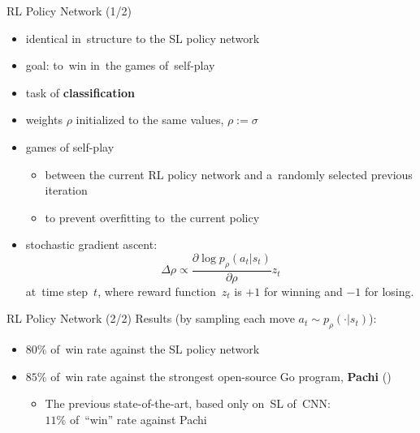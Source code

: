 \documentclass{beamer}
\begin{document}
{    \begin{frame}{RL Policy Network (1/2)}
      \begin{itemize}[<+- | alert@+>]
        \item identical in~structure to the SL policy network
        \item goal: to~win in~the games of~self-play
        \item task of \textbf{classification}
        \item weights $\rho$ initialized to the same values, $\rho := \sigma$
        \item games of self-play
          \begin{itemize}[<+- | alert@+>]
            \item between the current RL policy network and a~randomly selected previous iteration
            \item to prevent overfitting to~the current policy
          \end{itemize}
        \item stochastic gradient ascent:
          \[
            \Delta \rho \propto \frac{\partial \log p_\rho (a_t|s_t)}{\partial \rho} z_t
          \]
          {\tiny at~time step~$t$, where reward function~$z_t$ is $+1$ for winning and $-1$ for losing.}
      \end{itemize}
      \pause
    \end{frame}

    \begin{frame}{RL Policy Network (2/2)}
      Results (by sampling each move $a_t \sim p_\rho(\cdot | s_t)$):
      \pause
      \begin{itemize}[<+- | alert@+>]
        \item $80\%$ of~win rate against the SL policy network
        \item $85\%$ of~win rate against the strongest open-source Go program, \textbf{Pachi} (\cite{Baudivs2011pachi})
          \begin{itemize}[<+- | alert@+>]
            \item The previous state-of-the-art, based only on~SL of~CNN: \\
              $11\%$ of~``win'' rate against Pachi
          \end{itemize}
      \end{itemize}
    \end{frame}

}
\end{document}
